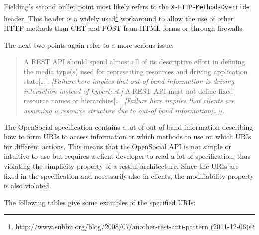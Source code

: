 \documentclass[12pt,a4paper]{scrartcl}		%
\newcommand{\citeurl}[2]{\url{#1} (#2)}
\begin{document}
Fielding's second bullet point most likely refers to the
\texttt{X-HTTP-Method-Override} header. This header is a widely
used\footnote{\citeurl{http://www.subbu.org/blog/2008/07/another-rest-anti-pattern}{2011-12-06}}
workaround to allow the use of other HTTP methods than GET and POST from HTML
forms or through firewalls.

The next two points again refer to a more serious issue:

\begin{quote}
  A REST API should spend almost all of its descriptive effort in defining the
  media type(s) used for representing resources and driving application
  state[\ldots].  \textit{[Failure here implies that out-of-band information is
    driving interaction instead of hypertext.]}  A REST API must not define
  fixed resource names or hierarchies[\ldots] \textit{[Failure here implies that
    clients are assuming a resource structure due to out-of band
    information[\ldots]].}
\end{quote}

The OpenSocial specification contains a lot of out-of-band information
describing how to form URIs to access information or which methods to use on
which URIs for different actions. This means that the OpenSocial API is not
simple or intuitive to use but requires a client developer to read a lot of
specification, thus violating the simplicity property of a restful
architecture. Since the URIs are fixed in the specification and necessarily also
in clients, the modifiability property is also violated.\cite[sec
2.3]{Fielding2000}

The following tables give some examples of the specified URIs:
\end{document}
